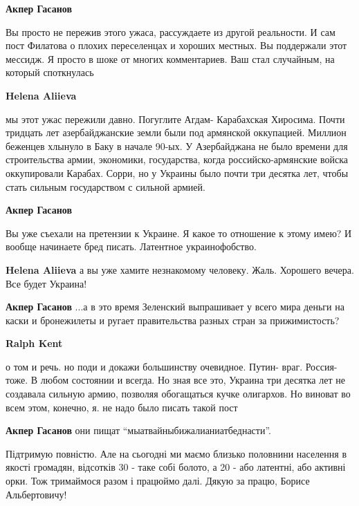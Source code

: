 \begin{itemize}
\begin{itemize}
\textbf{Акпер Гасанов} 

Вы просто не пережив этого ужаса, рассуждаете из другой реальности. И сам пост
Филатова о плохих переселенцах и хороших местных. Вы поддержали этот мессидж. Я
просто в шоке от многих комментариев. Ваш стал случайным, на который
споткнулась

\textbf{Helena Aliieva} 

мы этот ужас пережили давно. Погуглите Агдам- Карабахская Хиросима. Почти
тридцать лет азербайджанские земли были под армянской оккупацией. Миллион
беженцев хлынуло в Баку в начале 90-ых. У Азербайджана не было времени для
строительства армии, экономики, государства, когда российско-армянские войска
оккупировали Карабах. Сорри, но у Украины было почти три десятка лет, чтобы
стать сильным государством с сильной армией.

\textbf{Акпер Гасанов} 

Вы уже съехали на претензии к Украине. Я какое то отношение к этому имею? И
вообще начинаете бред писать. Латентное украинофобство.

\textbf{Helena Aliieva} а вы уже хамите незнакомому человеку. Жаль. Хорошего вечера. Все будет Украина!

\textbf{Акпер Гасанов} ...а в это время Зеленский выпрашивает у всего мира деньги на каски и бронежилеты и ругает правительства разных стран за прижимистость?

\textbf{Ralph Kent} 

о том и речь. но поди и докажи большинству очевидное. Путин- враг. Россия-
тоже. В любом состоянии и всегда. Но зная все это, Украина три десятка лет не
создавала сильную армию, позволяя обогащаться кучке олигархов. Но виноват во
всем этом, конечно, я. не надо было писать такой пост

\textbf{Акпер Гасанов} они пищат \enquote{мыатвайныбижалианиатбеднасти}.

\end{itemize} %


Підтримую повністю. Але на сьогодні ми маємо близько половнини населення в
якості громадян, відсотків 30 - таке собі болото, а 20 - або латентні, або
активні орки. Тож тримаймося разом і працюймо далі. Дякую за працю, Борисе
Альбертовичу!



\end{itemize}
